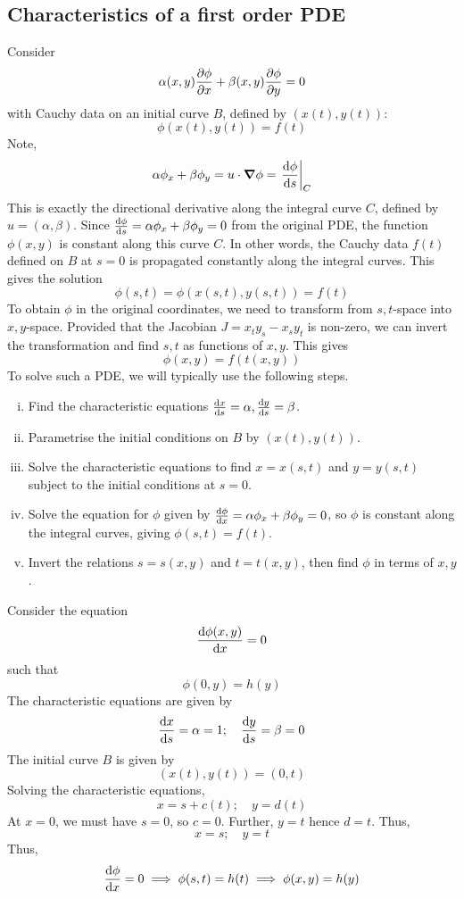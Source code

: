 \subsection{Characteristics of a first order PDE}
Consider
\[
	\alpha(x,y) \pdv{\phi}{x} + \beta(x,y) \pdv{\phi}{y} = 0
\]
with Cauchy data on an initial curve \( B \), defined by \( (x(t), y(t)) \):
\[
	\phi(x(t), y(t)) = f(t)
\]
Note,
\[
	\alpha \phi_x + \beta \phi_y = u \cdot \grad{\phi} = \eval{\dv{\phi}{s}}_C
\]
This is exactly the directional derivative along the integral curve \( C \), defined by \( u = (\alpha, \beta) \).
Since \( \dv{\phi}{s} = \alpha \phi_x + \beta \phi_y = 0 \) from the original PDE, the function \( \phi(x,y) \) is constant along this curve \( C \).
In other words, the Cauchy data \( f(t) \) defined on \( B \) at \( s = 0 \) is propagated constantly along the integral curves.
This gives the solution
\[
	\phi(s,t) = \phi(x(s,t), y(s,t)) = f(t)
\]
To obtain \( \phi \) in the original coordinates, we need to transform from \( s,t \)-space into \( x,y \)-space.
Provided that the Jacobian \( J = x_t y_s - x_s y_t \) is non-zero, we can invert the transformation and find \( s,t \) as functions of \( x,y \).
This gives
\[
	\phi(x,y) = f(t(x,y))
\]
To solve such a PDE, we will typically use the following steps.
\begin{enumerate}[(i)]
	\item Find the characteristic equations \( \dv{x}{s} = \alpha, \dv{y}{s} = \beta \).
	\item Parametrise the initial conditions on \( B \) by \( (x(t), y(t)) \).
	\item Solve the characteristic equations to find \( x = x(s,t) \) and \( y = y(s,t) \) subject to the initial conditions at \( s = 0 \).
	\item Solve the equation for \( \phi \) given by \( \dv{\phi}{x} = \alpha \phi_x + \beta \phi_y = 0 \), so \( \phi \) is constant along the integral curves, giving \( \phi(s,t) = f(t) \).
	\item Invert the relations \( s = s(x,y) \) and \( t = t(x,y) \), then find \( \phi \) in terms of \( x,y \).
\end{enumerate}
\begin{example}
	Consider the equation
	\[
		\dv{\phi(x,y)}{x} = 0
	\]
	such that
	\[
		\phi(0,y) = h(y)
	\]
	The characteristic equations are given by
	\[
		\dv{x}{s} = \alpha = 1;\quad \dv{y}{s} = \beta = 0
	\]
	The initial curve \( B \) is given by
	\[
		(x(t), y(t)) = (0,t)
	\]
	Solving the characteristic equations,
	\[
		x = s + c(t);\quad y = d(t)
	\]
	At \( x = 0 \), we must have \( s = 0 \), so \( c = 0 \).
	Further, \( y = t \) hence \( d = t \).
	Thus,
	\[
		x = s;\quad y = t
	\]
	Thus,
	\[
		\dv{\phi}{x} = 0 \implies \phi(s,t) = h(t) \implies \phi(x,y) = h(y)
	\]
\end{example}
